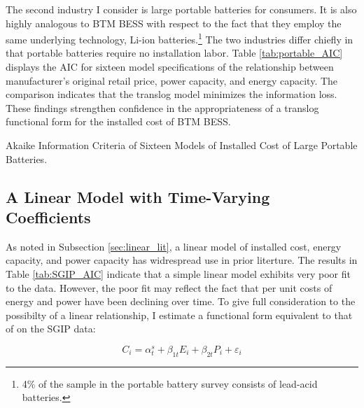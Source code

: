 The second industry I consider is large portable batteries for consumers. It is also highly analogous to BTM BESS with respect to the fact that they employ the same underlying technology, Li-ion batteries.\footnote{4\% of the sample in the portable battery survey consists of lead-acid batteries.} The two industries differ chiefly in that portable batteries require no installation labor. Table \ref{tab:portable_AIC} displays the AIC for sixteen model specifications of the relationship between manufacturer's original retail price, power capacity, and energy capacity. The comparison indicates that the translog model minimizes the information loss. These findings strengthen confidence in the appropriateness of a translog functional form for the installed cost of BTM BESS.

\begin{table}[t]
\centering

\caption{Akaike Information Criteria of Sixteen Models of Installed Cost of Large Portable Batteries.}\label{tab:portable_AIC}
\end{table}

\subsection{A Linear Model with Time-Varying Coefficients}\label{apdx:time_var_coef}

As noted in Subsection \ref{sec:linear_lit}, a linear model of installed cost, energy capacity, and power capacity has widrespread use in prior literture. The results in Table \ref{tab:SGIP_AIC} indicate that a simple linear model exhibits very poor fit to the data. However, the poor fit may reflect the fact that per unit costs of energy and power have been declining over time. To give full consideration to the possibilty of a linear relationship, I estimate a functional form equivalent to that of \citet{augustineblair2021} on the SGIP data: 

\begin{equation}\label{eq:augustineblair2021}
    C_i = \alpha^{s}_{t} + \beta_{1t} E_i + \beta_{2t} P_i + \varepsilon_i
\end{equation}

